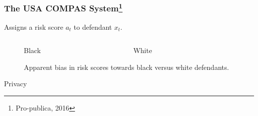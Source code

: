 \documentclass{beamer}
\begin{document}
\begin{frame}
  \frametitle{The USA COMPAS System\footnote{Pro-publica, 2016}}
  Assigns a \alert{risk score} $a_t$ to defendant $x_t$.
  \begin{figure}[H]
    \begin{columns}
      \begin{column}{0.5\textwidth}
        \centering
        \def\svgwidth{.95\columnwidth}
        
        Black
      \end{column}
      \begin{column}{0.5\textwidth}
        \centering
        \def\svgwidth{0.95\columnwidth}
              
        White
      \end{column}
    \end{columns}
    \label{fig:risk-bias}
    \caption{Apparent bias in risk scores towards black versus white defendants.}
  \end{figure}
\end{frame}


\begin{frame}
  \begin{center}
    {\Huge Privacy}
  \end{center}
\end{frame}
\end{document}
